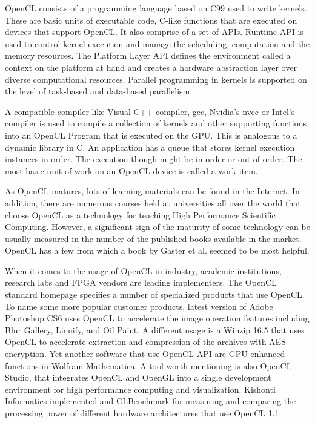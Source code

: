 OpenCL consists of a programming language based on C99 used to write kernels. These are basic units of executable code, C-like functions that are executed on devices that support OpenCL. It also comprise of a set of APIs. Runtime API is used to control kernel execution and manage the scheduling, computation and the memory resources. The Platform Layer API defines the environment called a context on the platform at hand and creates a hardware abstraction layer over diverse computational resources. Parallel programming in kernels is supported on the level of task-based and data-based parallelism.

A compatible compiler like Visual C++ compiler, gcc, Nvidia's nvcc or Intel's compiler is used to compile a collection of kernels and other supporting functions into an OpenCL Program that is executed on the GPU. This is analogous to a dynamic library in C. An application has a queue that stores kernel execution instances in-order. The execution though might be in-order or out-of-order. The most basic unit of work on an OpenCL device is called a work item.

As OpenCL matures, lots of learning materials can be found in the Internet. In addition, there are numerous courses held at universities all over the world that choose OpenCL as a technology for teaching High Performance Scientific Computing. However, a significant sign of the maturity of some technology can be usually measured in the number of the published books available in the market. OpenCL has a few from which a book by Gaster et al. \cite{gaster2011heterogeneous} seemed to be most helpful.

When it comes to the usage of OpenCL in industry, academic institutions, research labs and FPGA vendors are leading implementers. The OpenCL standard homepage\cite{khronos_opencl} specifies a number of specialized products that use OpenCL. To name some more popular customer products, latest version of Adobe Photoshop CS6 uses OpenCL to accelerate the image operation features including Blur Gallery, Liquify, and Oil Paint. A different usage is a Winzip 16.5 that uses OpenCL to accelerate extraction and compression of the archives with AES encryption. Yet another software that use  OpenCL API are GPU-enhanced functions in Wolfram Mathematica. A tool worth-mentioning is also OpenCL Studio, that integrates OpenCL and OpenGL into a single development environment for high performance computing and visualization. Kishonti Informatics implemented and CLBenchmark for measuring and comparing the processing power of different hardware architectures that use OpenCL 1.1.

